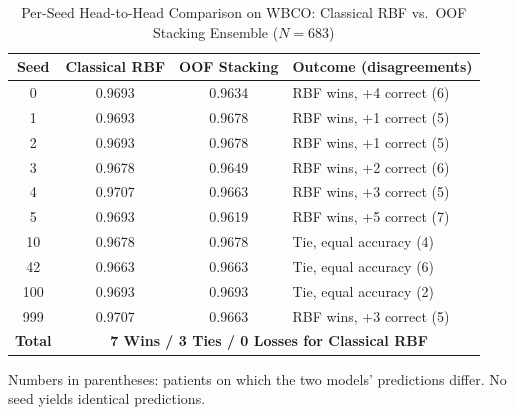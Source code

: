 \documentclass[journal,twocolumn]{IEEEtran}
\begin{document}
\begin{table}[!t]
\caption{Per-Seed Head-to-Head Comparison on WBCO: Classical RBF vs.\ OOF Stacking Ensemble ($N=683$)}
\label{tab:wbco_seeds}
\centering
\scriptsize
\setlength{\tabcolsep}{4pt}
\renewcommand{\arraystretch}{1.15}
\begin{tabular}{cccl}
\toprule
\textbf{Seed} & \textbf{Classical RBF} & \textbf{OOF Stacking} & \textbf{Outcome (disagreements)} \\
\midrule
0   & 0.9693 & 0.9634 & RBF wins, +4 correct (6) \\
1   & 0.9693 & 0.9678 & RBF wins, +1 correct (5) \\
2   & 0.9693 & 0.9678 & RBF wins, +1 correct (5) \\
3   & 0.9678 & 0.9649 & RBF wins, +2 correct (6) \\
4   & 0.9707 & 0.9663 & RBF wins, +3 correct (5) \\
5   & 0.9693 & 0.9619 & RBF wins, +5 correct (7) \\
10  & 0.9678 & 0.9678 & Tie, equal accuracy (4) \\
42  & 0.9663 & 0.9663 & Tie, equal accuracy (6) \\
100 & 0.9693 & 0.9693 & Tie, equal accuracy (2) \\
999 & 0.9707 & 0.9663 & RBF wins, +3 correct (5) \\
\midrule
\textbf{Total} & \multicolumn{3}{c}{\textbf{7 Wins / 3 Ties / 0 Losses for Classical RBF}} \\
\bottomrule
\end{tabular}

\vspace{2pt}
{\tiny Numbers in parentheses: patients on which the two models' predictions differ. No seed yields identical predictions.\par}
\end{table}
\end{document}
